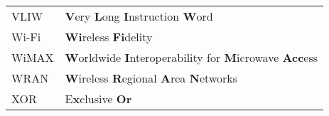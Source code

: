 \begin{center}
\begin{longtable}{ p{}  p{} }
VLIW        & \textbf{V}ery \textbf{L}ong \textbf{I}nstruction \textbf{W}ord                                                  \\
Wi-Fi       & \textbf{Wi}reless \textbf{Fi}delity                                                                             \\
WiMAX       & \textbf{W}orldwide \textbf{I}nteroperability for \textbf{M}icrowave \textbf{Acc}ess                             \\
WRAN        & \textbf{W}ireless \textbf{R}egional \textbf{A}rea \textbf{N}etworks                                             \\
XOR         & E\textbf{x}clusive \textbf{Or}                                                                                  \\
\end{longtable}
\end{center}

